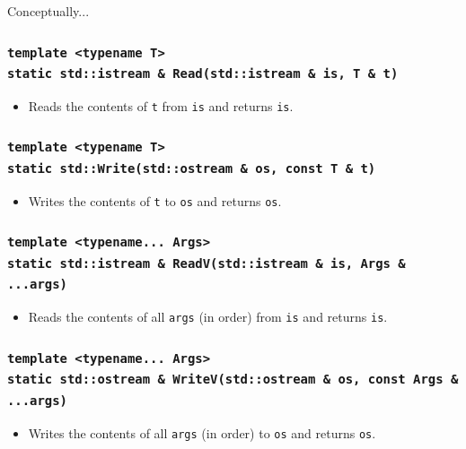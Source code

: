 \begin{minipage}{\textwidth}
Conceptually...

\subsubsection{\texttt{template <typename T>}\\ \texttt{static std::istream \& Read(std::istream \& is, T \& t)}}
\begin{itemize}[noitemsep,nolistsep]
\item Reads the contents of \texttt{t} from \texttt{is} and returns
  \texttt{is}.
\end{itemize}

\subsubsection{\texttt{template <typename T>}\\ \texttt{static std::Write(std::ostream \& os, const T \& t)}}
\begin{itemize}[noitemsep,nolistsep]
\item Writes the contents of \texttt{t} to \texttt{os} and returns
  \texttt{os}.
\end{itemize}

\subsubsection{\texttt{template <typename... Args>}\\ \texttt{static std::istream \& ReadV(std::istream \& is, Args \& ...args)}}
\begin{itemize}[noitemsep,nolistsep]
\item Reads the contents of all \texttt{args} (in order) from \texttt{is}
  and returns \texttt{is}.
\end{itemize}

\subsubsection{\texttt{template <typename... Args>}\\ \texttt{static std::ostream \& WriteV(std::ostream \& os, const Args \& ...args)}}
\begin{itemize}[noitemsep,nolistsep]
\item Writes the contents of all \texttt{args} (in order) to \texttt{os}
  and returns \texttt{os}.
\end{itemize}

\end{minipage}

